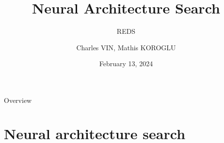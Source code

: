 \documentclass[aspectratio=169,xcolor=dvipsnames]{beamer}
\title[NAS]{Neural Architecture Search} %
\subtitle{REDS}
\author[Charles, Mathis] {Charles VIN, Mathis KOROGLU}
\institute[SU] %
{
    Sorbonne Université %
}
\date{February 13, 2024} %
\begin{document}
\begin{frame}
    \titlepage
\end{frame}

\begin{frame}{Overview}
    \tableofcontents
\end{frame}

\section{Neural architecture search}
\end{document}
